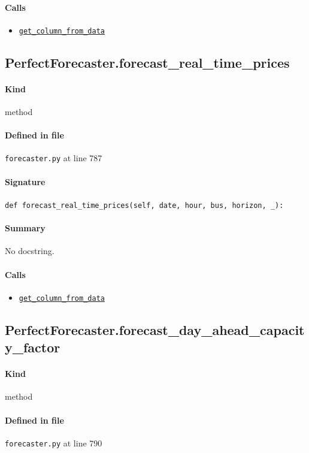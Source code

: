 \documentclass[11pt]{report}
\begin{document}
\paragraph{Calls}
\begin{itemize}[leftmargin=*]
  \item \hyperref[def:forecaster.py:PerfectForecaster.get_column_from_data:L762]{\texttt{get\_column\_from\_data}}
\end{itemize}
\subsection{PerfectForecaster.forecast\_real\_time\_prices}
\label{def:forecaster.py:PerfectForecaster.forecast_real_time_prices:L787}
\paragraph{Kind} method
\paragraph{Defined in file} \texttt{forecaster.py} at line 787
\paragraph{Signature} \texttt{def forecast\_real\_time\_prices(self, date, hour, bus, horizon, \_):}
\paragraph{Summary} No docstring.
\paragraph{Calls}
\begin{itemize}[leftmargin=*]
  \item \hyperref[def:forecaster.py:PerfectForecaster.get_column_from_data:L762]{\texttt{get\_column\_from\_data}}
\end{itemize}
\subsection{PerfectForecaster.forecast\_day\_ahead\_capacity\_factor}
\label{def:forecaster.py:PerfectForecaster.forecast_day_ahead_capacity_factor:L790}
\paragraph{Kind} method
\paragraph{Defined in file} \texttt{forecaster.py} at line 790
\end{document}
